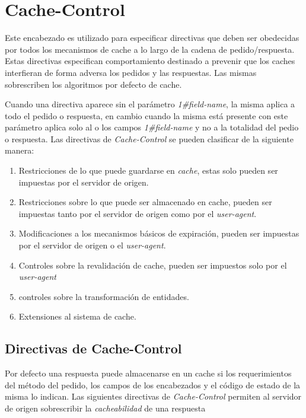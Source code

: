 \documentclass[a4paper,12pt]{report}
\begin{document}
\section{Cache-Control}
Este encabezado es utilizado para especificar directivas que deben ser obedecidas por todos los mecanismos de cache a lo largo de la cadena de pedido/respuesta.
Estas directivas especifican comportamiento destinado a prevenir que los caches interfieran de forma adversa los pedidos y las respuestas. Las mismas sobrescriben los
algoritmos por defecto de cache.

Cuando una directiva aparece sin el parámetro \emph{1\#field-name}, la misma aplica a todo el pedido o respuesta, en cambio cuando la misma está presente con este parámetro
aplica solo al o los campos \emph{1\#field-name} y no a la totalidad del pedio o respuesta.
Las directivas de \emph{Cache-Control} se pueden clasificar de la siguiente manera:

\begin{enumerate}
  \item Restricciones de lo que puede guardarse en \emph{cache}, estas solo pueden ser impuestas por el servidor de origen.
  \item Restricciones sobre lo que puede ser almacenado en cache, pueden ser impuestas tanto por el servidor de origen como por el \emph{user-agent}.
  \item Modificaciones a los mecanismos básicos de expiración, pueden ser impuestas por el servidor de origen o el \emph{user-agent}.
  \item Controles sobre la revalidación de cache, pueden ser impuestos solo por el \emph{user-agent}
  \item controles sobre la transformación de entidades.
  \item Extensiones al sistema de cache.
\end{enumerate}

\subsection{Directivas de Cache-Control}
Por defecto una respuesta puede almacenarse en un cache si los requerimientos del método del pedido, los campos de los encabezados y el código de estado de la misma lo
indican. Las siguientes directivas de \emph{Cache-Control} permiten al servidor de origen sobrescribir la \emph{cacheabilidad} de una respuesta
\end{document}
